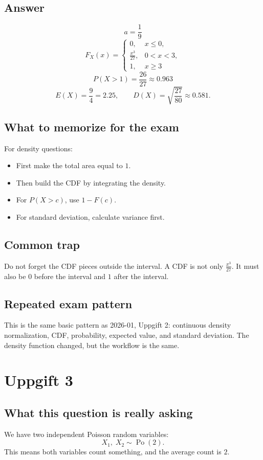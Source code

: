 \documentclass[11pt,a4paper]{article}
\begin{document}
\subsection*{Answer}
\[
\boxed{a=\frac{1}{9}}
\]
\[
\boxed{
F_X(x)=
\begin{cases}
0, & x\le 0,\\
\frac{x^3}{27}, & 0<x<3,\\
1, & x\ge 3
\end{cases}}
\]
\[
\boxed{P(X>1)=\frac{26}{27}\approx 0.963}
\]
\[
\boxed{E(X)=\frac{9}{4}=2.25},\qquad
\boxed{D(X)=\sqrt{\frac{27}{80}}\approx 0.581.}
\]

\subsection*{What to memorize for the exam}
For density questions:
\begin{itemize}[leftmargin=*]
    \item First make the total area equal to \(1\).
    \item Then build the CDF by integrating the density.
    \item For \(P(X>c)\), use \(1-F(c)\).
    \item For standard deviation, calculate variance first.
\end{itemize}

\subsection*{Common trap}
Do not forget the CDF pieces outside the interval. A CDF is not only \(\frac{x^3}{27}\). It must also be \(0\) before the interval and \(1\) after the interval.

\subsection*{Repeated exam pattern}
This is the same basic pattern as 2026-01, Uppgift 2: continuous density normalization, CDF, probability, expected value, and standard deviation. The density function changed, but the workflow is the same.

\section*{Uppgift 3}

\subsection*{What this question is really asking}
We have two independent Poisson random variables:
\[
X_1,\;X_2\sim \operatorname{Po}(2).
\]
This means both variables count something, and the average count is \(2\).
\end{document}
